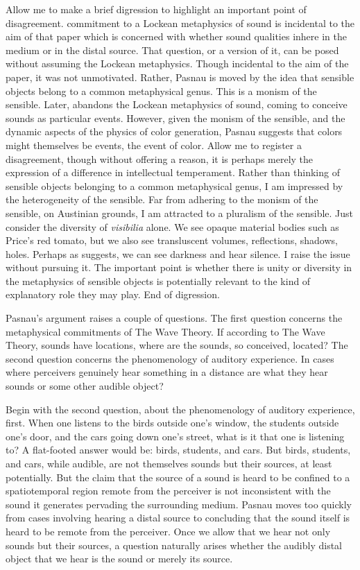 Allow me to make a brief digression to highlight an important point of disagreement. \citet{Pasnau:1999ss} commitment to a Lockean metaphysics of sound is incidental to the aim of that paper which is concerned with whether sound qualities inhere in the medium or in the distal source. That question, or a version of it, can be posed without assuming the Lockean metaphysics. Though incidental to the aim of the paper, it was not unmotivated. Rather, Pasnau is moved by the idea that sensible objects belong to a common metaphysical genus. This is a monism of the sensible. Later, \citet{Pasnau:2009ys} abandons the Lockean metaphysics of sound, coming to conceive sounds as particular events. However, given the monism of the sensible, and the dynamic aspects of the physics of color generation, Pasnau suggests that colors might themselves be events, the event of color. Allow me to register a disagreement, though without offering a reason, it is perhaps merely the expression of a difference in intellectual temperament. Rather than thinking of sensible objects belonging to a common metaphysical genus, I am impressed by the heterogeneity of the sensible. Far from adhering to the monism of the sensible, on Austinian grounds, I am attracted to a pluralism of the sensible. Just consider the diversity of \emph{visibilia} alone. We see opaque material bodies such as Price's \citeyearpar{Price:1932fk} red tomato, but we also see transluscent volumes, reflections, shadows, holes. Perhaps as \citet{Sorensen:2004jk,Sorensen:2008kx,Sorensen:2009aa} suggests, we can see darkness and hear silence. I raise the issue without pursuing it. The important point is whether there is unity or diversity in the metaphysics of sensible objects is potentially relevant to the kind of explanatory role they may play. End of digression.

Pasnau's argument raises a couple of questions. The first question concerns the metaphysical commitments of The Wave Theory. If according to The Wave Theory, sounds have locations, where are the sounds, so conceived, located? The second question concerns the phenomenology of auditory experience. In cases where perceivers genuinely hear something in a distance are what they hear sounds or some other audible object? 

Begin with the second question, about the phenomenology of auditory experience, first. When one listens to the birds outside one's window, the students outside one's door, and the cars going down one's street, what is it that one is listening to? A flat-footed answer would be: birds, students, and cars. But birds, students, and cars, while audible, are not themselves sounds but their sources, at least potentially. But the claim that the source of a sound is heard to be confined to a spatiotemporal region remote from the perceiver is not inconsistent with the sound it generates pervading the surrounding medium. Pasnau moves too quickly from cases involving hearing a distal source to concluding that the sound itself is heard to be remote from the perceiver. Once we allow that we hear not only sounds but their sources, a question naturally arises whether the audibly distal object that we hear is the sound or merely its source.


